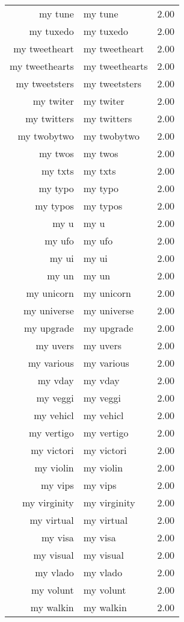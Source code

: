 \begin{table}[ht]
\begin{tabular}{rlr}
  my tune & my tune & 2.00 \\ 
  my tuxedo & my tuxedo & 2.00 \\ 
  my tweetheart & my tweetheart & 2.00 \\ 
  my tweethearts & my tweethearts & 2.00 \\ 
  my tweetsters & my tweetsters & 2.00 \\ 
  my twiter & my twiter & 2.00 \\ 
  my twitters & my twitters & 2.00 \\ 
  my twobytwo & my twobytwo & 2.00 \\ 
  my twos & my twos & 2.00 \\ 
  my txts & my txts & 2.00 \\ 
  my typo & my typo & 2.00 \\ 
  my typos & my typos & 2.00 \\ 
  my u & my u & 2.00 \\ 
  my ufo & my ufo & 2.00 \\ 
  my ui & my ui & 2.00 \\ 
  my un & my un & 2.00 \\ 
  my unicorn & my unicorn & 2.00 \\ 
  my universe & my universe & 2.00 \\ 
  my upgrade & my upgrade & 2.00 \\ 
  my uvers & my uvers & 2.00 \\ 
  my various & my various & 2.00 \\ 
  my vday & my vday & 2.00 \\ 
  my veggi & my veggi & 2.00 \\ 
  my vehicl & my vehicl & 2.00 \\ 
  my vertigo & my vertigo & 2.00 \\ 
  my victori & my victori & 2.00 \\ 
  my violin & my violin & 2.00 \\ 
  my vips & my vips & 2.00 \\ 
  my virginity & my virginity & 2.00 \\ 
  my virtual & my virtual & 2.00 \\ 
  my visa & my visa & 2.00 \\ 
  my visual & my visual & 2.00 \\ 
  my vlado & my vlado & 2.00 \\ 
  my volunt & my volunt & 2.00 \\ 
  my walkin & my walkin & 2.00 \\ 

\end{tabular}
\end{table}
